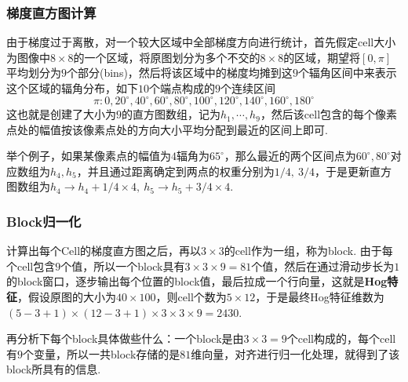 \documentclass[12pt, a4paper, oneside]{ctexart}
\numberwithin{equation}{section}  %
\begin{document}
\subsubsection{梯度直方图计算}
由于梯度过于离散，对一个较大区域中全部梯度方向进行统计，首先假定cell大小为图像中$8\times 8$的一个区域，将原图划分为多个不交的$8\times 8$的区域，期望将$[0,\pi]$平均划分为$9$个部分(bins)，然后将该区域中的梯度均摊到这$9$个辐角区间中来表示这个区域的辐角分布，如下$10$个端点构成的$9$个连续区间
\begin{equation*}
  \pi: 0,20^\circ, 40^\circ, 60^\circ, 80^\circ, 100^\circ, 120^\circ, 140^\circ, 160^\circ, 180^\circ
\end{equation*}
这也就是创建了大小为$9$的直方图数组，记为$h_1,\cdots,h_9$，然后该cell包含的每个像素点处的幅值按该像素点处的方向大小平均分配到最近的区间上即可.

举个例子，如果某像素点的幅值为$4$辐角为$65^\circ$，那么最近的两个区间点为$60^\circ, 80^\circ$对应数组为$h_4,h_5$，并且通过距离确定到两点的权重分别为$1/4,\ 3/4$，于是更新直方图数组为$h_4\rightarrow h_4+1/4\times 4,\ h_5\rightarrow h_5+3/4\times 4$.
\subsubsection{Block归一化}
计算出每个Cell的梯度直方图之后，再以$3\times 3$的cell作为一组，称为block. 由于每个cell包含$9$个值，所以一个block具有$3\times 3\times 9=81$个值，然后在通过滑动步长为$1$的block窗口，逐步输出每个位置的block值，最后拉成一个行向量，这就是\textbf{Hog特征}，假设原图的大小为$40\times 100$，则cell个数为$5\times 12$，于是最终Hog特征维数为$(5-3+1)\times(12-3+1)\times 3\times 3\times 9 = 2430$.

再分析下每个block具体做些什么：一个block是由$3\times 3 = 9$个cell构成的，每个cell有$9$个变量，所以一共block存储的是$81$维向量，对齐进行归一化处理，就得到了该block所具有的信息.
\end{document}
